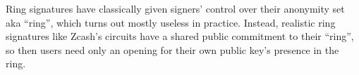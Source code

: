 Ring signatures have classically given signers' control over their anonymity set aka ``ring'', which turns out mostly useless in practice.  Instead, realistic ring signatures like Zcash's circuits \cite{zcash_prorocol} have a shared public commitment to their ``ring'', so then users need only an opening for their own public key's presence in the ring. 






